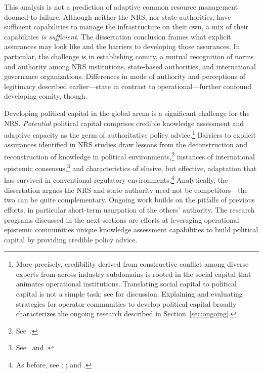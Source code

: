 \documentclass[12pt,journal,compsoc,letterpaper,onecolumn,twoside]{IEEEtran}
\begin{document}
This analysis is not a prediction of adaptive common resource
management doomed to failure.
%
Although neither the NRS, nor state
authorities, have sufficient capabilities to manage the infrastructure
on their own, a mix of their capabilities \emph{is sufficient}.   
%
The dissertation conclusion frames what explicit assurances
may look like and the barriers to developing those assurances.
%
In particular, the challenge is in establishing comity, a mutual
recognition of norms and authority among NRS institutions, state-based
authorities, and international governance organizations.  
%
Differences in mode of authority and perceptions of legitimacy
described earlier---state
in contrast to operational---further confound developing comity, though.

Developing political capital in the
global arena is a significant challenge  for the NRS. 
%
\emph{Potential} political
capital comprises 
credible knowledge assessment and adaptive capacity as the germ of
authoritative policy advice.\footnote{More precisely, credibility
  derived from constructive conflict among diverse experts from across
  industry subdomains is
  rooted in the social capital that animates operational
  institutions.  Translating social capital to political capital is
  not a simple task; see  for discussion.
  Explaining and 
  evaluating strategies for operator communities to develop  
  political capital broadly characterizes the ongoing research
  described in Section~\ref{sec:ongoing}.}
%
Barriers to explicit assurances identified in NRS studies draw lessons
from the deconstruction and 
reconstruction of knowledge in political
environments,\footnote{See~.}  
instances of international epistemic
consensus,\footnote{See~ and
  .} and  
characteristics of elusive, but effective, 
adaptation that has survived in conventional regulatory
environments.\footnote{As before, see ;
  ; and .}
%
Analytically, the dissertation argues the NRS and state authority need not be
competitors---the two can be quite complementary.  
%
Ongoing work builds on the pitfalls of previous efforts, in particular
short-term usurpation of the others'
authority.
%
The research programs discussed in the next sections are efforts at
leveraging operational epistemic communities unique knowledge
assessment capabilities to
build political capital by providing credible policy advice. 
\end{document}
